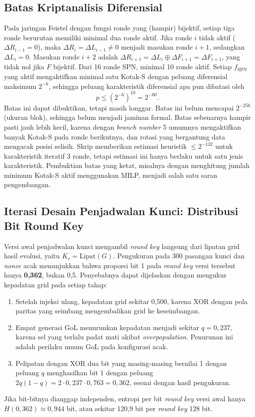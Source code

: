 \subsection{Batas Kriptanalisis Diferensial}
Pada jaringan Feistel dengan fungsi ronde yang (hampir) bijektif, setiap tiga ronde berurutan memiliki minimal dua ronde aktif. Jika ronde $i$ tidak aktif ($\Delta R_{i-1} = 0$), maka $\Delta R_i = \Delta L_{i-1} \neq 0$ menjadi masukan ronde $i+1$, sedangkan $\Delta L_i = 0$. Masukan ronde $i+2$ adalah $\Delta R_{i+1} = \Delta L_i \oplus \Delta F_{i+1} = \Delta F_{i+1}$, yang tidak nol jika $F$ bijektif. Dari 16 ronde SPN, minimal 10 ronde aktif. Setiap $f_{\text{SPN}}$ yang aktif mengaktifkan minimal satu Kotak-S dengan peluang diferensial maksimum $2^{-6}$, sehingga peluang karakteristik diferensial apa pun dibatasi oleh
\begin{equation}
    p \le \left(2^{-6}\right)^{10} = 2^{-60}.
\end{equation}
Batas ini dapat dibuktikan, tetapi masih longgar. Batas ini belum mencapai $2^{-256}$ (ukuran blok), sehingga belum menjadi jaminan formal. Batas sebenarnya hampir pasti jauh lebih kecil, karena  dengan \textit{branch number} 5 umumnya mengaktifkan banyak Kotak-S pada ronde berikutnya, dan rotasi yang bergantung data mengacak posisi selisih. Skrip  memberikan estimasi heuristik $\leq 2^{-132}$ untuk karakteristik iteratif 3 ronde, tetapi estimasi ini hanya berlaku untuk satu jenis karakteristik. Pembuktian batas yang ketat, misalnya dengan menghitung jumlah minimum Kotak-S aktif menggunakan MILP, menjadi salah satu saran pengembangan.

\subsection{Iterasi Desain Penjadwalan Kunci: Distribusi Bit Round Key}
\label{sec:rk-density}
Versi awal penjadwalan kunci mengambil \textit{round key} langsung dari lipatan grid hasil evolusi, yaitu $K_r = \mathrm{Lipat}(G)$. Pengukuran pada 300 pasangan kunci dan \textit{nonce} acak menunjukkan bahwa proporsi bit 1 pada \textit{round key} versi tersebut hanya \textbf{0,362}, bukan 0,5. Penyebabnya dapat dijelaskan dengan mengukur kepadatan grid pada setiap tahap:
\begin{enumerate}
    \item Setelah injeksi ulang, kepadatan grid sekitar 0,500, karena XOR dengan pola paritas yang seimbang mengembalikan grid ke keseimbangan.
    \item Empat generasi GoL menurunkan kepadatan menjadi sekitar $q = 0{,}237$, karena sel yang terlalu padat mati akibat \textit{overpopulation}. Penurunan ini adalah perilaku umum GoL pada konfigurasi acak.
    \item Pelipatan dengan XOR dua bit yang masing-masing bernilai 1 dengan peluang $q$ menghasilkan bit 1 dengan peluang $2q(1-q) = 2 \cdot 0{,}237 \cdot 0{,}763 = 0{,}362$, sesuai dengan hasil pengukuran.
\end{enumerate}
Jika bit-bitnya dianggap independen, entropi per bit \textit{round key} versi awal hanya $H(0{,}362) \approx 0{,}944$ bit, atau sekitar 120,9 bit per \textit{round key} 128 bit.

